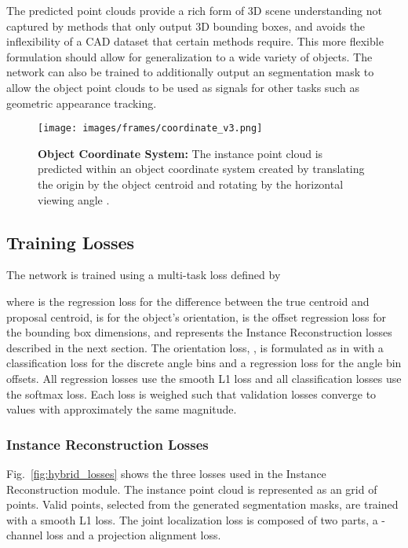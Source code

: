 \documentclass[10pt,twocolumn,letterpaper]{article}
\begin{document}
	The predicted point clouds provide a rich form of 3D scene understanding not captured by methods that only output 3D bounding boxes, and avoids the inflexibility of a CAD dataset that certain methods \cite{chabot_deepmanta, kundu_3drcnn} require. This more flexible formulation should allow for generalization to a wide variety of objects. The network can also be trained to additionally output an  segmentation mask to allow the object point clouds to be used as signals for other tasks such as geometric appearance tracking.
	
	\begin{figure}[t]
		\begin{center}
			\texttt{[image: images/frames/coordinate\_v3.png]}
		\end{center}
		\caption{\textbf{Object Coordinate System:} The instance point cloud is predicted within an object coordinate system created by translating the origin by the object centroid and rotating by the horizontal viewing angle .}
		\label{fig:pc_normalization}
	\end{figure}
		
	\subsection{Training Losses}\label{sec:losses}
	The network is trained using a multi-task loss defined by
	
where  is the regression loss for the difference between the true centroid and proposal centroid,  is for the object's orientation,  is the offset regression loss for the bounding box dimensions, and  represents the Instance Reconstruction losses described in the next section. The orientation loss, , is formulated as in \cite{qi_fpointnet} with a classification loss for the discrete angle bins and a regression loss for the angle bin offsets. All regression losses use the smooth L1 loss and all classification losses use the softmax loss. Each loss is weighed such that validation losses converge to values with approximately the same magnitude.
	
	\subsubsection{Instance Reconstruction Losses}
	Fig.~\ref{fig:hybrid_losses} shows the three losses used in the Instance Reconstruction module. The instance point cloud is represented as an  grid of points. Valid points, selected from the generated segmentation masks, are trained with a smooth L1 loss. The joint localization loss is composed of two parts, a -channel loss and a projection alignment loss.
	
\end{document}
